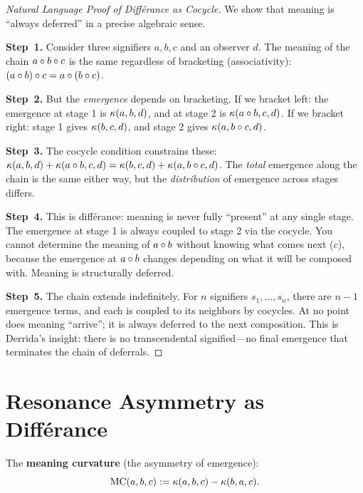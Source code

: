\begin{proof}[Natural Language Proof of Diff\'erance as Cocycle]
We show that meaning is ``always deferred'' in a precise algebraic sense.

\textbf{Step~1.} Consider three signifiers $a, b, c$ and an observer $d$.
The meaning of the chain $a \circ b \circ c$ is the same regardless of
bracketing (associativity): $(a \circ b) \circ c = a \circ (b \circ c)$.

\textbf{Step~2.} But the \emph{emergence} depends on bracketing. If we
bracket left: the emergence at stage 1 is $\kappa(a, b, d)$, and at stage 2
is $\kappa(a \circ b, c, d)$. If we bracket right: stage 1 gives
$\kappa(b, c, d)$, and stage 2 gives $\kappa(a, b \circ c, d)$.

\textbf{Step~3.} The cocycle condition constrains these:
$\kappa(a, b, d) + \kappa(a \circ b, c, d) = \kappa(b, c, d)
+ \kappa(a, b \circ c, d)$.
The \emph{total} emergence along the chain is the same either way, but the
\emph{distribution} of emergence across stages differs.

\textbf{Step~4.} This is diff\'erance: meaning is never fully ``present''
at any single stage. The emergence at stage 1 is always coupled to stage 2
via the cocycle. You cannot determine the meaning of $a \circ b$ without
knowing what comes next ($c$), because the emergence at $a \circ b$ changes
depending on what it will be composed with. Meaning is structurally deferred.

\textbf{Step~5.} The chain extends indefinitely. For $n$ signifiers
$s_1, \ldots, s_n$, there are $n-1$ emergence terms, and each is coupled
to its neighbors by cocycles. At no point does meaning ``arrive''; it is
always deferred to the next composition. This is Derrida's insight:
there is no transcendental signified---no final emergence that terminates
the chain of deferrals.
\end{proof}

\section{Resonance Asymmetry as Diff\'erance}

\begin{definition}
\label{def:curvature}
The \textbf{meaning curvature} (the asymmetry of emergence):
\[
\mathrm{MC}(a, b, c) := \kappa(a, b, c) - \kappa(b, a, c).
\]
\end{definition}

